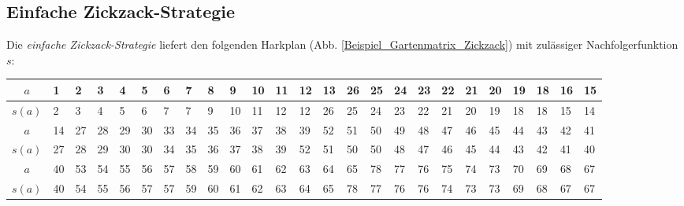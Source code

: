 \subsection{Einfache Zickzack-Strategie}\label{Zickzack_einfach}
\noindent Die \textit{einfache Zickzack-Strategie} liefert den folgenden Harkplan (Abb. \ref{Beispiel_Gartenmatrix_Zickzack}) mit zulässiger Nachfolgerfunktion $s$: 

\begin{center}
\begin{minipage}{\textwidth}
\renewcommand{\arraystretch}{1.2}
\begin{scriptsize}
\begin{tabular}{|c|*{24}{|p{.15cm}}|}
\hline
$a$&1&2&3&4&5&6&7&8&9&10&11&12&13&26&25&24&23&22&21&20&19&18&16&15 \\
\hline
$s(a)$&2&3&4&5&6&7&7&9&10&11&12&12&26&25&24&23&22&21&20&19&18&18&15&14\\
\hline \hline
$a$&14&27&28&29&30&33&34&35&36&37&38&39&52&51&50&49&48&47&46&45&44&43&42&41\\
\hline
$s(a)$&27&28&29&30&30&34&35&36&37&38&39&52&51&50&50&48&47&46&45&44&43&42&41&40\\
\hline \hline
$a$&40&53&54&55&56&57&58&59&60&61&62&63&64&65&78&77&76&75&74&73&70&69&68&67\\
\hline
$s(a)$&40&54&55&56&57&57&59&60&61&62&63&64&65&78&77&76&76&74&73&73&69&68&67&67\\
\hline
\end{tabular}
\label{Beispiel_HF_Zickzack_einfach}
\end{scriptsize} 
\renewcommand{\arraystretch}{1}


\end{minipage}
\end{center}
